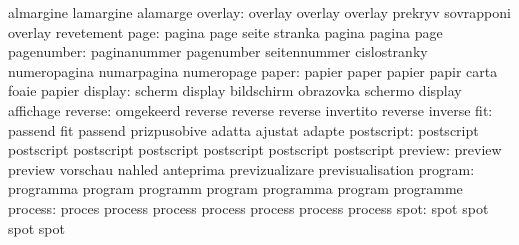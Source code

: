                            almargine                 lamargine
                           alamarge
                  overlay: overlay                   overlay
                           overlay                   prekryv
                           sovrapponi                overlay
                           revetement
                     page: pagina                    page
                           seite                     stranka
                           pagina                    pagina
                           page
               pagenumber: paginanummer              pagenumber
                           seitennummer              cislostranky
                           numeropagina              numarpagina
                           numeropage
                    paper: papier                    paper
                           papier                    papir
                           carta                     foaie
                           papier
                  display: scherm                    display
                           bildschirm                obrazovka
                           schermo                   display
                           affichage
                  reverse: omgekeerd                 reverse
                           reverse                   reverse
                           invertito                 reverse
                           inverse
                      fit: passend                   fit
                           passend                   prizpusobive
                           adatta                    ajustat
                           adapte
               postscript: postscript                postscript
                           postscript                postscript
                           postscript                postscript
                           postscript
                  preview: preview                   preview
                           vorschau                  nahled
                           anteprima                 previzualizare
                           previsualisation
                  program: programma                 program
                           programm                  program
                           programma                 program
                           programme
                  process: proces                    process
                           process                   process
                           process                   process
                           process
                     spot: spot                      spot
                           spot                      spot
